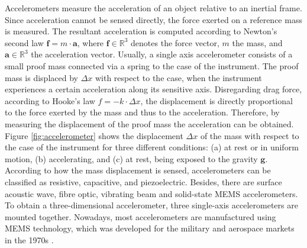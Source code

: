 Accelerometers measure the acceleration of an object relative to an inertial frame. Since acceleration cannot be sensed directly, the force exerted on a reference mass is measured. The resultant acceleration is computed according to Newton's second law $\mathbf{f} = m \cdot \mathbf{a}$, where $\mathbf{f} \in \mathbb{R}^3$ denotes the force vector, $m$ the mass, and $\mathbf{a} \in \mathbb{R}^3$ the acceleration vector. Usually, a single axis accelerometer consists of a small proof mass connected via a spring to the case of the instrument. The proof mass is displaced  by $\Delta x$ with respect to the case, when the instrument experiences a certain acceleration along its sensitive axis. Disregarding drag force, according to Hooke's law $f = -k \cdot \Delta x$, the displacement is directly proportional to the force exerted by the mass and thus to the acceleration. Therefore, by measuring the displacement of the proof mass the acceleration can be obtained. Figure \ref{fig:accelerometer} shows the displacement $\Delta x$ of the mass with respect to the case of the instrument for three different conditions: (a) at rest or in uniform motion, (b) accelerating, and (c) at rest, being exposed to the gravity $ \mathbf{g}$. According to how the mass displacement is sensed, accelerometers can be classified as resistive, capacitive, and piezoelectric. Besides, there are surface acoustic wave, fibre optic, vibrating beam and solid-state \gls{MEMS} accelerometers. To obtain a three-dimensional accelerometer, three single-axis accelerometers are mounted together. Nowadays, most accelerometers are manufactured using MEMS technology, which was developed for the military and aerospace markets in the 1970s \cite{bhattacharyya_inertial_sensors_applications_13}. 

